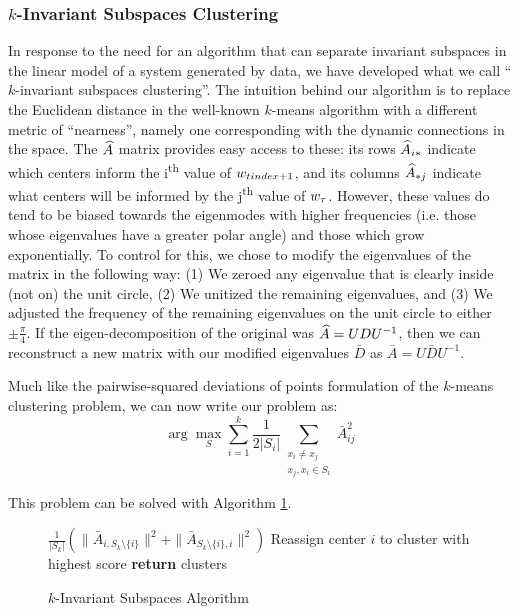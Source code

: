 \subsubsection{$k$-Invariant Subspaces Clustering}
In response to the need for an algorithm that can separate invariant subspaces in the linear model of a system generated by data, we have developed what we call ``$k$-invariant subspaces clustering''. The intuition behind our algorithm is to replace the Euclidean distance in the well-known $k$-means algorithm with a different metric of ``nearness'', namely one corresponding with the dynamic connections in the space. The $\widehat{A}$ matrix provides easy access to these: its rows $\widehat{A}_{i\ast}$ indicate which centers inform the i\textsuperscript{th} value of $w_{tindex+1}$, and its columns $\widehat{A}_{\ast j}$ indicate what centers will be informed by the j\textsuperscript{th} value of $w_{\tau}$. However, these values do tend to be biased towards the eigenmodes with higher frequencies (i.e. those whose eigenvalues have a greater polar angle) and those which grow exponentially. To  control for this, we chose to modify the eigenvalues of the matrix in the following way: (1) We zeroed any eigenvalue that is clearly inside (not on) the unit circle, (2) We unitized the remaining eigenvalues, and (3) We adjusted the frequency of the remaining eigenvalues on the unit circle to either $\pm \frac{\pi}{4}$. If the eigen-decomposition of the original was $\widehat{A} = UDU^{-1}$, then we can reconstruct a new matrix with our modified eigenvalues $\bar D$ as $\bar A = U\bar D U^{-1}$.

Much like the pairwise-squared deviations of points formulation of the $k$-means clustering problem, we can now write our problem as:
$$\arg\max_S \sum_{i=1}^k \frac{1}{2|S_i|} \sum_{\substack{x_i \neq x_j \\ x_j,x_i\in S_i}} \bar A_{ij}^2 $$

This problem can be solved with Algorithm \ref{kinvsub}.

\begin{figure}[t!]
	\begin{algorithm}[H]
		\caption{$k$-Invariant Subspaces Algorithm}
		\label{kinvsub}
		\begin{algorithmic}
				 $ \frac{1}{|S_k|} \left( \|\bar A_{i, S_k\setminus \{i\} } \|^2 + \|\bar A_{S_k\setminus \{i\},i} \|^2 \right)$
				\STATE Reassign center $i$ to cluster with highest score
				\ENDFOR
				\ENDWHILE   
				\STATE \textbf{return} clusters
		\end{algorithmic}
	\end{algorithm}
	\vspace{-0.2in}
\end{figure}



